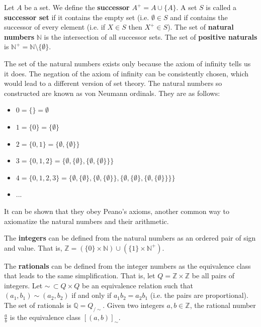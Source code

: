 \documentclass{bareminimum}
\begin{document}
\begin{defn}\label{defn_successor_set}
	Let $A$ be a set. We define the \textbf{successor} $A^+ = A \cup \{A\}$. A set $S$ is called a \textbf{successor set} if it contains the empty set (i.e. $\emptyset \in S$ and if contains the successor of every element (i.e. if $X \in S$ then $X^+ \in S$). The set of \textbf{natural numbers} $\mathbb{N}$ is the intersection of all successor sets. The set of \textbf{positive naturals} is $\mathbb{N}^+ = \mathbb{N} \setminus \{ \emptyset \}$.
\end{defn}
\begin{remark}
	The set of the natural numbers exists only because the axiom of infinity tells us it does. The negation of the axiom of infinity can be consistently chosen, which would lead to a different version of set theory. The natural numbers so constructed are known as von Neumann ordinals. They are as follows:
	\begin{itemize}
		\item $0 = \{ \} = \emptyset$
		\item $1 = \{ 0 \} = \{ \emptyset \}$
		\item $2 = \{0, 1\} = \{ \emptyset, \{ \emptyset\} \}$
		\item $3 = \{0, 1, 2\} = \{ \emptyset, \{ \emptyset\}, \{ \emptyset, \{ \emptyset\} \} \}$
		\item $4 = \{0, 1, 2, 3\} = \{ \emptyset, \{ \emptyset\}, \{ \emptyset, \{ \emptyset\} \}, \{ \emptyset, \{ \emptyset\}, \{ \emptyset, \{ \emptyset\} \} \} \}$
		\item ...
	\end{itemize}
	It can be shown that they obey Peano's axioms, another common way to axiomatize the natural numbers and their arithmetic.
\end{remark}

\begin{defn}
	The \textbf{integers} can be defined from the natural numbers as an ordered pair of sign and value. That is, $\mathbb{Z} = (\{ 0 \} \times \mathbb{N}) \cup (\{ 1 \} \times \mathbb{N}^+)$.
\end{defn}

\begin{defn}
	The \textbf{rationals} can be defined from the integer numbers as the equivalence class that leads to the same simplification. That is, let $Q = \mathbb{Z} \times \mathbb{Z}$ be all pairs of integers. Let $\sim \, \subset Q \times Q$ be an equivalence relation such that $(a_1, b_1) \sim (a_2, b_2)$ if and only if $a_1 b_2 = a_2 b_1$ (i.e. the pairs are proportional). The set of rationals is $\mathbb{Q} = Q_{/\sim}$. Given two integers $a, b \in \mathbb{Z}$, the rational number $\frac{a}{b}$ is the equivalence class $[(a,b)]_{\sim}$.
\end{defn}
\end{document}
